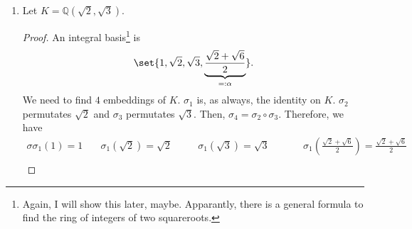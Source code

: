 \begin{example}
\begin{enumerate}
\begin{proof}
\begin{alignat*}
            &\quad \sigma_2(\zeta_3^2 \alpha) = \alpha && \quad \sigma_3(\zeta_3^2 \alpha) = \alpha
        \end{alignat*}
        or shorter, \(\sigma_1: \alpha \mapsto \alpha\), \(\sigma_2: \alpha \mapsto \zeta_3 \alpha\) and \(\sigma_3: \alpha \mapsto \zeta_3^2 \alpha\). Applying the embeddings on the integral basis yields
        \begin{alignat*}
            \sigma \sigma_1(1) = 1 & \quad \sigma_1(\alpha) = \alpha && \quad \sigma_1(\alpha^2) = \alpha^2 \\
            \sigma_2(1) = 1 & \quad \sigma_2(\alpha) = \zeta_3 \alpha && \quad \sigma_2(\alpha^2) = \sigma_2(\alpha) \sigma_2(\alpha) = \zeta_3^2 \alpha^2 \\
            \sigma_3(1) = 1 & \quad \sigma_3(\alpha) = \zeta_3^2 \alpha && \quad \sigma_3(\alpha^2) = \sigma_3(\alpha) \sigma_3(\alpha) = \zeta_3 \alpha^2 \text{.}
        \end{alignat*}
        Therefore, the discriminant is
        \begin{align*}
            \Delta_K = \left(\det \begin{pmatrix}
                1 & \alpha & \alpha^2 \\
                1 & \zeta_3 \alpha & \zeta_3^2 \alpha^2 \\
                1 & \zeta_3^2 \alpha & \zeta_3 \alpha^2
            \end{pmatrix}\right)^2
            = \left(-6 i \sqrt{3}\right)^2 = -108 \text{.}
        \end{align*}
    \end{proof}
    \item Let \(K = \mathbb{Q}(\sqrt{2}, \sqrt{3})\).
    \begin{proof}
        An integral basis\footnote{Again, I will show this later, maybe. Apparantly, there is a general formula to find the ring of integers of two squareroots.} is
        \begin{align*}
            \set{1, \sqrt{2}, \sqrt{3}, \underbrace{\frac{\sqrt{2} + \sqrt{6}}{2}}_{=: \alpha}} \text{.}
        \end{align*}
        We need to find \(4\) embeddings of \(K\). \(\sigma_1\) is, as always, the identity on \(K\). \(\sigma_2\) permutates \(\sqrt{2}\) and \(\sigma_3\) permutates \(\sqrt{3}\). Then, \(\sigma_4 = \sigma_2 \circ \sigma_3\). Therefore, we have
        \begin{alignat*}
            \sigma \sigma_1(1) = 1 & \quad \sigma_1(\sqrt{2}) = \sqrt{2} && \quad \sigma_1(\sqrt{3}) = \sqrt{3} &&& \quad \sigma_1 \left(\frac{\sqrt{2} + \sqrt{6}}{2}\right) = \frac{\sqrt{2} + \sqrt{6}}{2} \\

\end{alignat*}
\end{proof}
\end{enumerate}
\end{example}
